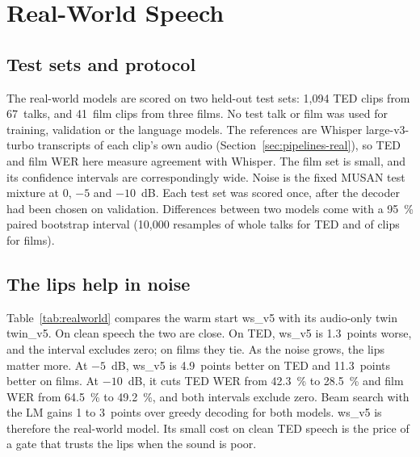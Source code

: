 \section{Real-World Speech}
\label{sec:realworld}

\subsection{Test sets and protocol}
The real-world models are scored on two held-out test sets: 1,094 TED clips from 67~talks, and
41~film clips from three films. No test talk or film was used for training, validation or the
language models. The references are Whisper large-v3-turbo transcripts of each clip's own audio
(Section~\ref{sec:pipelines-real}), so TED and film WER here measure agreement with Whisper. The
film set is small, and its confidence intervals are correspondingly wide. Noise is the fixed
MUSAN test mixture at 0, $-5$ and $-10$~dB. Each test set was scored once, after the decoder had
been chosen on validation. Differences between two models come with a 95~\% paired bootstrap
interval (10,000 resamples of whole talks for TED and of clips for films).

\subsection{The lips help in noise}
Table~\ref{tab:realworld} compares the warm start ws\_v5 with its audio-only twin twin\_v5. On
clean speech the two are close. On TED, ws\_v5 is 1.3~points worse, and the interval excludes
zero; on films they tie. As the noise grows, the lips matter more. At $-5$~dB, ws\_v5 is
4.9~points better on TED and 11.3~points better on films. At $-10$~dB, it cuts TED WER from
42.3~\% to 28.5~\% and film WER from 64.5~\% to 49.2~\%, and both intervals exclude zero.
Beam search with the LM gains 1 to 3~points over greedy decoding for both models. ws\_v5 is
therefore the real-world model. Its small cost on clean TED speech is the price of a gate that
trusts the lips when the sound is poor.


